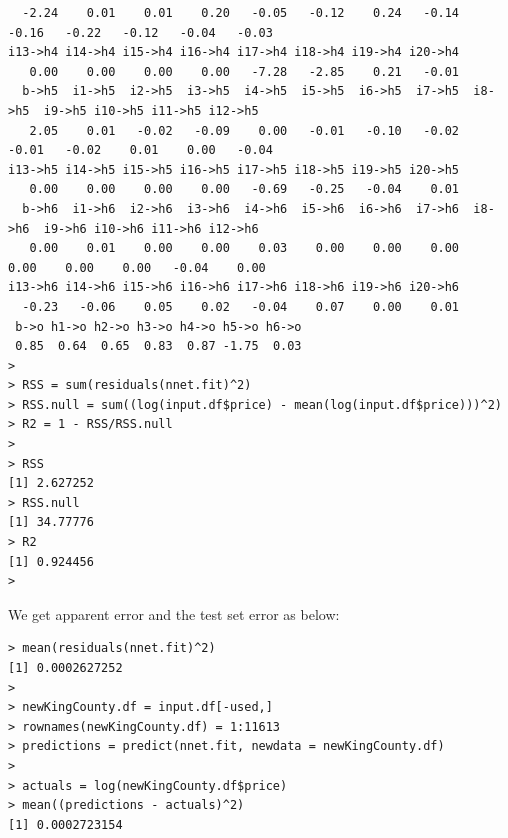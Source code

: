 \documentclass{article}%
\begin{document}
\begin{verbatim}
  -2.24    0.01    0.01    0.20   -0.05   -0.12    0.24   -0.14   -0.16   -0.22   -0.12   -0.04   -0.03
i13->h4 i14->h4 i15->h4 i16->h4 i17->h4 i18->h4 i19->h4 i20->h4
   0.00    0.00    0.00    0.00   -7.28   -2.85    0.21   -0.01
  b->h5  i1->h5  i2->h5  i3->h5  i4->h5  i5->h5  i6->h5  i7->h5  i8->h5  i9->h5 i10->h5 i11->h5 i12->h5
   2.05    0.01   -0.02   -0.09    0.00   -0.01   -0.10   -0.02   -0.01   -0.02    0.01    0.00   -0.04
i13->h5 i14->h5 i15->h5 i16->h5 i17->h5 i18->h5 i19->h5 i20->h5
   0.00    0.00    0.00    0.00   -0.69   -0.25   -0.04    0.01
  b->h6  i1->h6  i2->h6  i3->h6  i4->h6  i5->h6  i6->h6  i7->h6  i8->h6  i9->h6 i10->h6 i11->h6 i12->h6
   0.00    0.01    0.00    0.00    0.03    0.00    0.00    0.00    0.00    0.00    0.00   -0.04    0.00
i13->h6 i14->h6 i15->h6 i16->h6 i17->h6 i18->h6 i19->h6 i20->h6
  -0.23   -0.06    0.05    0.02   -0.04    0.07    0.00    0.01
 b->o h1->o h2->o h3->o h4->o h5->o h6->o
 0.85  0.64  0.65  0.83  0.87 -1.75  0.03
>
> RSS = sum(residuals(nnet.fit)^2)
> RSS.null = sum((log(input.df$price) - mean(log(input.df$price)))^2)
> R2 = 1 - RSS/RSS.null
>
> RSS
[1] 2.627252
> RSS.null
[1] 34.77776
> R2
[1] 0.924456
>
\end{verbatim}

We get apparent error and the test set error as below:
\begin{verbatim}
> mean(residuals(nnet.fit)^2)
[1] 0.0002627252
>
> newKingCounty.df = input.df[-used,]
> rownames(newKingCounty.df) = 1:11613
> predictions = predict(nnet.fit, newdata = newKingCounty.df)
>
> actuals = log(newKingCounty.df$price)
> mean((predictions - actuals)^2)
[1] 0.0002723154
\end{verbatim}
\end{document}
